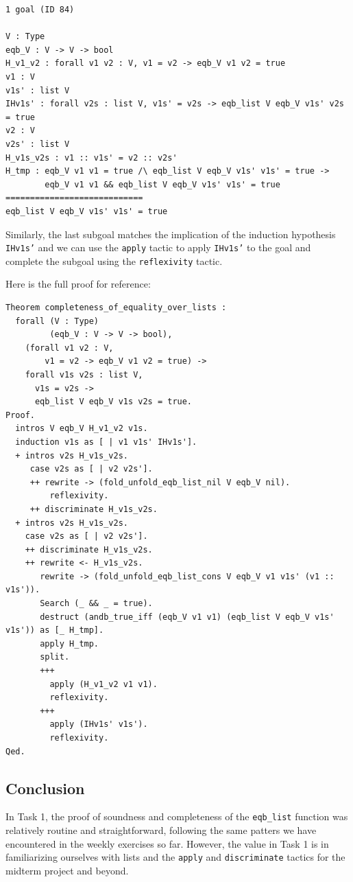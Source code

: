 \documentclass{article}
\begin{document}
\begin{lstlisting}
1 goal (ID 84)

V : Type
eqb_V : V -> V -> bool
H_v1_v2 : forall v1 v2 : V, v1 = v2 -> eqb_V v1 v2 = true
v1 : V
v1s' : list V
IHv1s' : forall v2s : list V, v1s' = v2s -> eqb_list V eqb_V v1s' v2s = true
v2 : V
v2s' : list V
H_v1s_v2s : v1 :: v1s' = v2 :: v2s'
H_tmp : eqb_V v1 v1 = true /\ eqb_list V eqb_V v1s' v1s' = true ->
        eqb_V v1 v1 && eqb_list V eqb_V v1s' v1s' = true
============================
eqb_list V eqb_V v1s' v1s' = true
\end{lstlisting}

Similarly, the last subgoal matches the implication of the induction hypothesis \texttt{IHv1s'} and we can use the \texttt{apply} tactic to apply \texttt{IHv1s'} to the goal and complete the subgoal using the \texttt{reflexivity} tactic.

Here is the full proof for reference:

\begin{lstlisting}
Theorem completeness_of_equality_over_lists :
  forall (V : Type)
         (eqb_V : V -> V -> bool),
    (forall v1 v2 : V,
        v1 = v2 -> eqb_V v1 v2 = true) ->
    forall v1s v2s : list V,
      v1s = v2s ->
      eqb_list V eqb_V v1s v2s = true.
Proof.
  intros V eqb_V H_v1_v2 v1s.
  induction v1s as [ | v1 v1s' IHv1s'].
  + intros v2s H_v1s_v2s.
     case v2s as [ | v2 v2s'].
     ++ rewrite -> (fold_unfold_eqb_list_nil V eqb_V nil).
         reflexivity.
     ++ discriminate H_v1s_v2s.
  + intros v2s H_v1s_v2s.
    case v2s as [ | v2 v2s'].
    ++ discriminate H_v1s_v2s.
    ++ rewrite <- H_v1s_v2s.
       rewrite -> (fold_unfold_eqb_list_cons V eqb_V v1 v1s' (v1 :: v1s')).
       Search (_ && _ = true).
       destruct (andb_true_iff (eqb_V v1 v1) (eqb_list V eqb_V v1s' v1s')) as [_ H_tmp].
       apply H_tmp.
       split.
       +++
         apply (H_v1_v2 v1 v1).
         reflexivity.
       +++
         apply (IHv1s' v1s').
         reflexivity.
Qed.    
\end{lstlisting}  

\subsection{Conclusion}

In Task 1, the proof of soundness and completeness of the \texttt{eqb\_list} function was relatively routine and straightforward, following the same patters we have encountered in the weekly exercises so far. However, the value in Task 1 is in familiarizing ourselves with lists and the \texttt{apply} and \texttt{discriminate} tactics for the midterm project and beyond.
\end{document}
